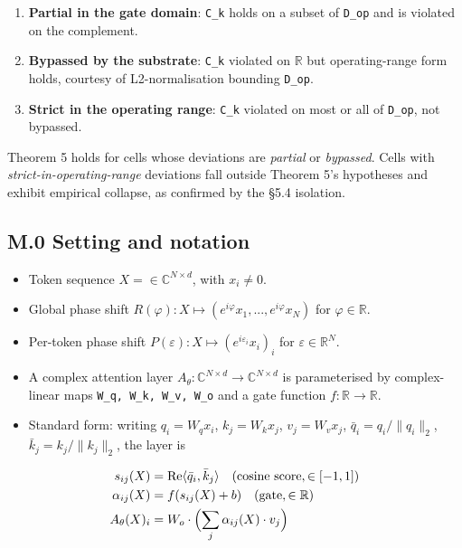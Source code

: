 \documentclass[11pt,a4paper]{article}
\theoremstyle{plain}
\theoremstyle{definition}
\renewcommand{\Re}{\operatorname{Re}}
\begin{document}
\begin{enumerate}
  \item \textbf{Partial in the gate domain}: \texttt{C\_k} holds on a subset of \texttt{D\_op} and is violated on the complement.
  \item \textbf{Bypassed by the substrate}: \texttt{C\_k} violated on $\mathbb{R}$ but operating-range form holds, courtesy of L2-normalisation bounding \texttt{D\_op}.
  \item \textbf{Strict in the operating range}: \texttt{C\_k} violated on most or all of \texttt{D\_op}, not bypassed.
\end{enumerate}

Theorem 5 holds for cells whose deviations are \emph{partial} or \emph{bypassed}. Cells with \emph{strict-in-operating-range} deviations fall outside Theorem 5's hypotheses and exhibit empirical collapse, as confirmed by the \S{}5.4 isolation.

\subsection{M.0 Setting and notation}
\begin{itemize}
  \item Token sequence $X = \in  \mathbb{C}^{N\times d}$, with $x_i \ne  0$.
  \item Global phase shift $R(\varphi ) : X \mapsto  (e^{i\varphi } x_1, ..., e^{i\varphi } x_N)$ for $\varphi  \in  \mathbb{R}$.
  \item Per-token phase shift $P(\varepsilon ) : X \mapsto  (e^{i\varepsilon _i} x_i)_i$ for $\varepsilon  \in  \mathbb{R}^N$.
  \item A complex attention layer $A_\theta  : \mathbb{C}^{N\times d} \to  \mathbb{C}^{N\times d}$ is parameterised by complex-linear maps \texttt{W\_q, W\_k, W\_v, W\_o} and a gate function $f : \mathbb{R} \to  \mathbb{R}$.
  \item Standard form: writing $q_i = W_q x_i$, $k_j = W_k x_j$, $v_j = W_v x_j$, $\bar{q}_i = q_i / \|q_i\|_2$, $\bar{k}_j = k_j / \|k_j\|_2$, the layer is
\end{itemize}

\begin{align*}
s_{ij}(X) &= \Re\langle \bar{q}_i, \bar{k}_j \rangle \quad (\text{cosine score}, \in [-1, 1]) \\
\alpha_{ij}(X) &= f(s_{ij}(X) + b) \quad (\text{gate}, \in \mathbb{R}) \\
A_\theta(X)_i &= W_o \cdot \Bigl(\sum_j \alpha_{ij}(X) \cdot v_j\Bigr)
\end{align*}
\end{document}
